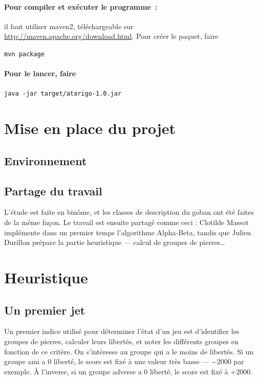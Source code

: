 \documentclass[11pt,a4paper,titlepage,french]{article}
\begin{document}
		\paragraph{Pour compiler et exécuter le programme~:} il faut utiliser maven2, téléchargeable sur \url{http://maven.apache.org/download.html}. Pour créer le paquet, faire
		\begin{center}
			\verb!mvn package!
		\end{center}

		\paragraph{Pour le lancer, faire}
		\begin{center}
			\verb!java -jar target/atarigo-1.0.jar!
		\end{center}


	\section{Mise en place du projet}
		\subsection{Environnement}
		\subsection{Partage du travail}
			L'étude est faite en binôme, et les classes de description du goban ont été faites de la même façon. Le travail est ensuite partagé comme ceci : Clotilde Massot implémente dans un premier temps l'algorithme Alpha-Beta, tandis que Julien Durillon prépare la partie heuristique --- calcul de groupes de pierres\dots %


	\section{Heuristique}

		\subsection{Un premier jet}
			Un premier indice utilisé pour déterminer l'état d'un jeu est d'identifier les groupes de pierres, calculer leurs libertés, et noter les différents groupes en fonction de ce critère. On s'intéresse au groupe qui a le moins de libertés. Si un groupe ami a 0 liberté, le score est fixé à une valeur très basse --- $-2000$ par exemple. À l'inverse, si un groupe adverse a 0 liberté, le score est fixé à $+2000$.
\end{document}
